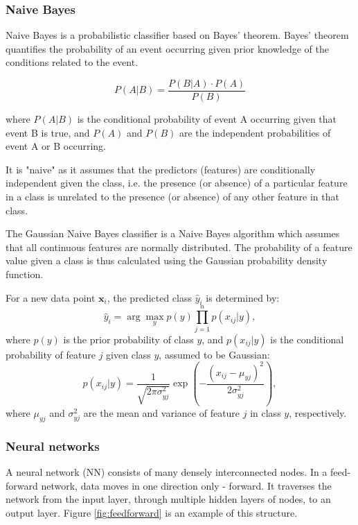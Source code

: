 \subsubsection{Naive Bayes}

Naive Bayes \cite{gaussiannb} is a probabilistic classifier based on Bayes' theorem. Bayes' theorem quantifies the probability of an event occurring given prior knowledge of the conditions related to the event. 

\begin{equation}
	P(A|B) = \frac{P(B|A) \cdot P(A)}{P(B)}
\end{equation}

where $P(A|B)$ is the conditional probability of event A occurring given that event B is true, and $P(A)$ and $P(B)$ are the independent probabilities of event A or B occurring.

It is "naive" as it assumes that the predictors (features) are conditionally independent given the class, i.e. the presence (or absence) of a particular feature in a class is unrelated to the presence (or absence) of any other feature in that class.

The Gaussian Naive Bayes classifier is a Naive Bayes algorithm which assumes that all continuous features are normally distributed. The probability of a feature value given a class is thus calculated using the Gaussian probability density function.

For a new data point \( \mathbf{x}_i \), the predicted class \( \hat{y}_i \) is determined by:
\begin{equation}
	\hat{y}_i = \arg\max_{y} p(y) \prod_{j=1}^{n} p(x_{ij} | y),
\end{equation}
where \( p(y) \) is the prior probability of class \( y \), and \( p(x_{ij} | y) \) is the conditional probability of feature \( j \) given class \( y \), assumed to be Gaussian:
\begin{equation}
	p(x_{ij} | y) = \frac{1}{\sqrt{2\pi\sigma_{yj}^2}} \exp\left( -\frac{(x_{ij} - \mu_{yj})^2}{2\sigma_{yj}^2} \right),
\end{equation}
where \( \mu_{yj} \) and \( \sigma_{yj}^2 \) are the mean and variance of feature \( j \) in class \( y \), respectively.

\subsubsection{Neural networks}

A neural network (NN)  \cite{mlp} consists of many densely interconnected nodes. In a feed-forward network, data moves in one direction only - forward. It traverses the network from the input layer, through multiple hidden layers of nodes, to an output layer. Figure \ref{fig:feedforward} is an example of this structure. 

